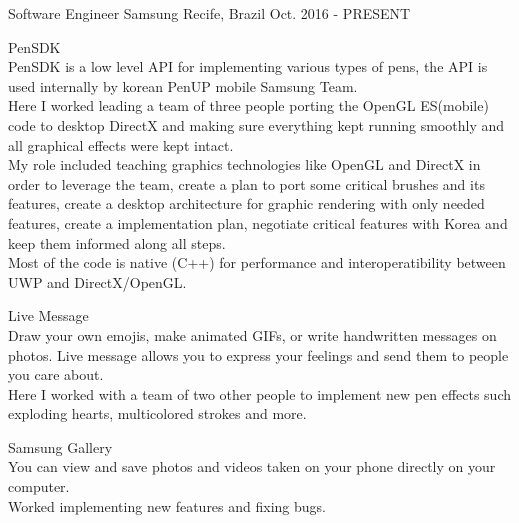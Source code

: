 

\begin{cventries}

  \cventry
    {Software Engineer} %
    {Samsung} %
    {Recife, Brazil} %
    {Oct. 2016 - PRESENT} %
    {
      \begin{cvitems} %
\item{PenSDK\\PenSDK is a low level API for implementing various types of pens, the API is used internally by korean PenUP mobile Samsung Team. \\
Here I worked leading a team of three people porting the OpenGL ES(mobile) code to desktop DirectX and making sure everything kept running smoothly and all graphical effects were kept intact.\\
My role included teaching graphics technologies like OpenGL and DirectX in order to leverage the team, create a plan to port some critical brushes and its features, 
create a desktop architecture for graphic rendering with only needed features, create a implementation plan, negotiate critical features with Korea and keep them informed along all steps.\\
Most of the code is native (C++) for performance and interoperatibility between UWP and DirectX/OpenGL.\\}
\item{Live Message\\
Draw your own emojis, make animated GIFs, or write handwritten messages on photos. Live message allows you to express your feelings and send them to people you care about.\\
Here I worked with a team of two other people to implement new pen effects such exploding hearts, multicolored strokes and more.\\}
\item{Samsung Gallery\\You can view and save photos and videos taken on your phone directly on your computer.\\
Worked implementing new features and fixing bugs. \\
}
\end{cvitems}}
\end{cventries}
